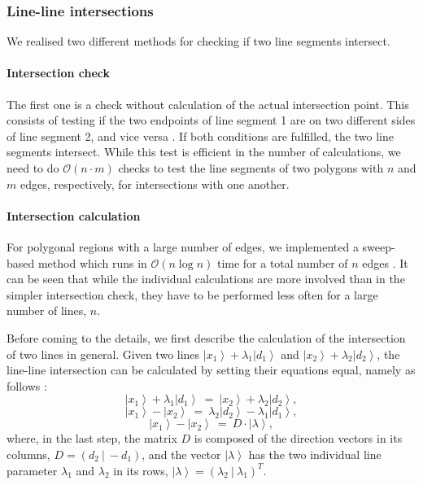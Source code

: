 \subsubsection*{Line-line intersections}
We realised two different methods for checking if two line segments intersect.

\paragraph{Intersection check}
The first one is a check without calculation of the actual intersection point. 
This consists of testing if the two endpoints of line segment 1 are on two different sides of line
segment 2, and vice versa \cite{TODO}. If both conditions are fulfilled, the two line segments intersect.
While this test is efficient in the number of calculations, we need to do $\mathcal{O}\left(n \cdot m\right)$ checks
to test the line segments of two polygons with $n$ and $m$ edges, respectively, for intersections with one another.

\paragraph{Intersection calculation}
For polygonal regions with a large number of edges, we implemented a sweep-based method which runs
in $\mathcal{O}\left(n \log n\right)$ time for a total number of $n$ edges \cite{TODO}. 
It can be seen that while the individual calculations are more involved than in the simpler intersection check, 
they have to be performed less often for a large number of lines, $n$.

Before coming to the details, we first describe the calculation of the intersection of two lines in general.
Given two lines $\left|x_1\right> + \lambda_1 \left|d_1\right>$ and $\left|x_2\right> + \lambda_2 \left|d_2\right>$, 
the line-line intersection can be calculated by setting their equations equal, namely as follows \cite{wiki_line_line_intersection}:
\begin{equation}
	\left|x_1\right> + \lambda_1 \left|d_1\right> \ =\ \left|x_2\right> + \lambda_2 \left|d_2\right>,
\end{equation}
\begin{equation}
	\left|x_1\right> - \left|x_2\right> \ =\  \lambda_2 \left|d_2\right> - \lambda_1 \left|d_1\right>,
\end{equation}
\begin{equation}
	\left|x_1\right> - \left|x_2\right> \ =\  D \cdot \left| \lambda \right>,
	\label{eq:line_line_inters}
\end{equation}
where, in the last step, the matrix $D$ is composed of the direction vectors in its columns, $D = \left( d_2 \ |\  -d_1 \right)$, 
and the vector $\left| \lambda \right>$ has the two individual line parameter $\lambda_1$ and $\lambda_2$ in its
rows, $\left| \lambda \right> = \left( \lambda_2 \ |\  \lambda_1 \right)^T$.

